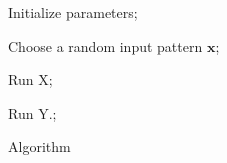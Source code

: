 \begin{algorithm}[!ht]
Initialize parameters;

{
	Choose a random input pattern $\boldsymbol{x}$;

    {
    	Run X;

    } {
    	Run Y.;
    }
}

\caption{Algorithm}
\label{alg:algorithm}
\end{algorithm}

